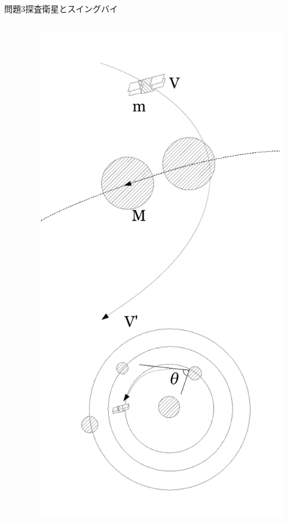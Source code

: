 \documentclass[dvipdfmx]{beamer}
\begin{document}
\begin{frame}{問題3}{探査衛星とスイングバイ}
\begin{columns}[t]
\begin{column}{0.7\textwidth}
\end{column}
\begin{column}{0.3\textwidth}
\begin{figure}[htbp]
    \centering
    \includegraphics[bb=0mm 0mm 100.0mm 170.0mm, scale=0.35, type=pdf]{img/problem3.pdf}
\end{figure}
\end{column}
\end{columns}
\end{frame}
\end{document}
